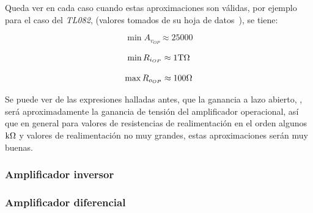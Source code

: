 Queda ver en cada caso cuando estas aproximaciones son válidas, por ejemplo para el caso del \textit{TL082}, (valores tomados de su hoja de datos~), se tiene:

\begin{equation}
\min A_{v_{OP}} \approx 25000
\end{equation}


\begin{equation}
\min R_{i_{OP}} \approx 1 \si[per-mode=symbol]{\tera\ohm}
\end{equation}


\begin{equation}
\max R_{o_{OP}} \approx 100 \si[per-mode=symbol]{\ohm}
\end{equation}

Se puede ver de las expresiones halladas antes, que la ganancia a lazo abierto, , será aproximadamente la ganancia de tensión del amplificador operacional, así que en general para valores de resistencias de realimentación en el orden algunos $\si[per-mode=symbol]{\kilo\ohm}$ y valores de realimentación no muy grandes, estas aproximaciones serán muy buenas.



\subsubsection{Amplificador inversor}


\subsubsection{Amplificador diferencial}